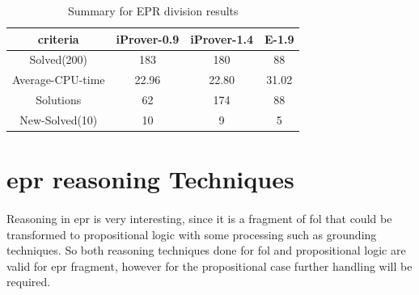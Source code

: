 \begin{table}[H]
	\centering
	\begin{tabular}{||c | c | c | c||} 
 		\hline
		criteria & iProver-0.9 & iProver-1.4 & E-1.9 \\ %
 		\hline\hline
		Solved(200) & 183 & 180 & 88 \\
		Average-CPU-time & 22.96 & 22.80 & 31.02 \\
		Solutions & 62 & 174 & 88 \\
		New-Solved(10) & 10 & 9 & 5 \\ [1ex] 
 		\hline
		\end{tabular}
	\caption{Summary for EPR division results}
	\label{table:epr_casc_results}
\end{table}




\section{\ac{epr} reasoning Techniques}
\paragraph{}
Reasoning in \ac{epr} is very interesting, since it is a fragment of \ac{fol} that could be transformed to propositional logic with some processing such as grounding techniques. So both reasoning techniques done for \ac{fol} and propositional logic are valid for \ac{epr} fragment, however for the propositional case further handling will be required.

